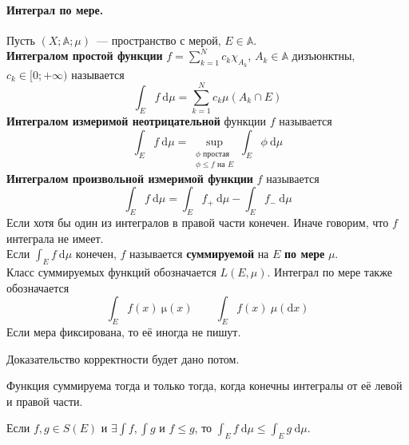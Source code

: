 \documentclass{article}
\begin{document}
    \paragraph{Интеграл по мере.}
    \begin{definition}
        Пусть $(X;\mathbb A;\mu)$~--- пространство с мерой, $E\in\mathbb A$.\\
        \textbf{Интегралом простой функции} $f=\sum\limits_{k=1}^Nc_k\chi_{A_k}$, $A_k\in\mathbb A$ дизъюнктны, $c_k\in[0;+\infty)$ называется
        $$\int_E f~\mathrm d\mu=\sum\limits_{k=1}^Nc_k\mu(A_k\cap E)$$
        \textbf{Интегралом измеримой неотрицательной} функции $f$ называется
        $$
        \int_E f~\mathrm d\mu=\sup\limits_{\substack{\phi\text{ простая}\\\phi\leqslant f\text{ на }E}}\int_E\phi~\mathrm d\mu
        $$
        \textbf{Интегралом произвольной измеримой функции} $f$ называется
        $$
        \int_Ef~\mathrm d\mu=\int_Ef_+~\mathrm d\mu-\int_Ef_-~\mathrm d\mu
        $$
        Если хотя бы один из интегралов в правой части конечен. Иначе говорим, что $f$ интеграла не имеет.\\
        Если $\int_Ef~\mathrm d\mu$ конечен, $f$ называется \textbf{суммируемой} на $E$ \textbf{по мере} $\mu$.\\
        Класс суммируемых функций обозначается $L(E,\mu)$. Интеграл по мере также обозначается
        $$
        \int_E f(x)~\mathrm\mu(x)\qquad\int_E f(x)~\mu(\mathrm dx)
        $$
        Если мера фиксирована, то её иногда не пишут.
    \end{definition}
    \begin{remark}
        Доказательство корректности будет дано потом.
    \end{remark}
    \begin{claim}
        Функция суммируема тогда и только тогда, когда конечны интегралы от её левой и правой части.
    \end{claim}
    \begin{theorem}
        \label{Монотонность интеграла по мере по функции}
        Если $f,g\in S(E)$ и $\exists\int f,\int g$ и $f\leqslant g$, то $\int_E f~\mathrm d\mu\leqslant\int_E g~\mathrm d\mu$.
    \end{theorem}
\end{document}
